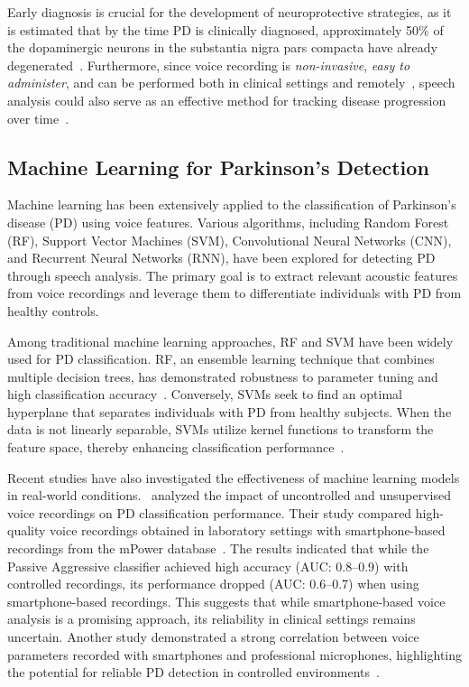 \documentclass{paper}
\begin{document}
Early diagnosis is crucial for the development of neuroprotective strategies, as it is estimated that by the time PD is clinically diagnosed, approximately 50\% of the dopaminergic neurons in the substantia nigra pars compacta have already degenerated~\cite{blesa2022motor, schapira2017non}. Furthermore, since voice recording is \textit{non-invasive}, \textit{easy to administer}, and can be performed both in clinical settings and remotely~\cite{virmani2022feasibility}, speech analysis could also serve as an effective method for tracking disease progression over time~\cite{skodda2009progression}.

\subsection{Machine Learning for Parkinson’s Detection}

Machine learning has been extensively applied to the classification of Parkinson’s disease (PD) using voice features. Various algorithms, including Random Forest (RF), Support Vector Machines (SVM), Convolutional Neural Networks (CNN), and Recurrent Neural Networks (RNN), have been explored for detecting PD through speech analysis. The primary goal is to extract relevant acoustic features from voice recordings and leverage them to differentiate individuals with PD from healthy controls.

Among traditional machine learning approaches, RF and SVM have been widely used for PD classification. RF, an ensemble learning technique that combines multiple decision trees, has demonstrated robustness to parameter tuning and high classification accuracy~\cite{hastie2009elements,breiman2001random}. Conversely, SVMs seek to find an optimal hyperplane that separates individuals with PD from healthy subjects. When the data is not linearly separable, SVMs utilize kernel functions to transform the feature space, thereby enhancing classification performance~\cite{hastie2009elements}.

Recent studies have also investigated the effectiveness of machine learning models in real-world conditions.~\citet{carron2021mobile} analyzed the impact of uncontrolled and unsupervised voice recordings on PD classification performance. Their study compared high-quality voice recordings obtained in laboratory settings with smartphone-based recordings from the mPower database~\cite{bot2016mpower}. The results indicated that while the Passive Aggressive classifier achieved high accuracy (AUC: 0.8–0.9) with controlled recordings, its performance dropped (AUC: 0.6–0.7) when using smartphone-based recordings. This suggests that while smartphone-based voice analysis is a promising approach, its reliability in clinical settings remains uncertain. Another study demonstrated a strong correlation between voice parameters recorded with smartphones and professional microphones, highlighting the potential for reliable PD detection in controlled environments~\cite{uloza2015exploring}.
\end{document}
